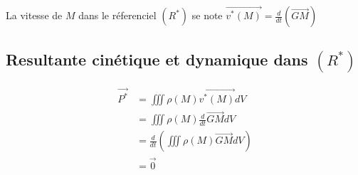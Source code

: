 \documentclass[../main.tex]{subfile}
\begin{document}
\begin{nota}	
	La vitesse de $M$ dans le réferenciel $(R^*)$ se note $\vec{v^*(M)} = \frac{d}{dt}(\vec{GM})$
\end{nota}

\subsection{Resultante cinétique et dynamique dans $(R^*)$}

\begin{defi}
	$$
\begin{aligned}
	\vec{P^*} &= \iiint \rho(M) \vec{v^*(M)} dV\\
	&= \iiint \rho(M) \frac{d}{dt} \vec{GM} dV\\
	&= \frac{d}{dt} (\iiint \rho(M) \vec{GM} dV)\\
	&= \vec{0}\\
\end{aligned}
	$$
\end{defi}
\end{document}
